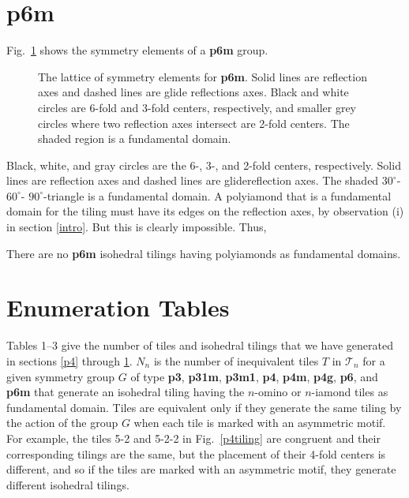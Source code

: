 \documentclass{ws-ijcga}
\begin{document}
\section{{\bf p6m}}
\label{p6m}
Fig.~\ref{fig:p6m} shows the symmetry elements of a {\bf p6m} group. 
\begin{figure}[h]
\centerline{
}
\vspace*{8pt}
\caption{
The lattice of symmetry elements for {\bf p6m}. 
Solid lines are reflection axes and dashed lines are glide reflections axes. 
Black and white circles are 6-fold and 3-fold centers, respectively, and smaller grey circles where
two reflection axes intersect are 2-fold centers. The shaded region is a fundamental domain.
\label{fig:p6m}
}
\end{figure}
Black, white, and gray circles are the 6-, 3-, and 2-fold centers, respectively. 
Solid lines are reflection axes and dashed lines are glidereflection axes. 
The shaded $30^\circ$- $60^\circ$- $90^\circ$-triangle is a fundamental domain. 
A polyiamond that is a fundamental domain for the tiling must have its edges on the reflection axes, 
by observation (i) in section \ref{intro}. 
But this is clearly impossible. Thus,
\begin{theorem}
There are no {\bf p6m} isohedral tilings having polyiamonds as fundamental domains.
\end{theorem}









\section{Enumeration Tables}
\label{tables}
Tables 1--3 give 
the number of tiles and isohedral tilings that we have generated in sections \ref{p4}
through \ref{p6m}. 
$N_n$ is the number of inequivalent tiles $T$ in $\mathscr{T}_n$
for a given symmetry group $G$ of type 
{\bf p3}, {\bf p31m}, {\bf p3m1}, {\bf p4}, {\bf p4m}, {\bf p4g}, {\bf p6},
and {\bf p6m} that generate an isohedral tiling having
the $n$-omino or $n$-iamond tiles as fundamental domain. 
Tiles are equivalent only if they generate the same tiling by the action of the group $G$ 
when each tile is marked with an asymmetric motif. 
For example, the tiles 5-2 and 5-2-2 in Fig.~\ref{p4tiling} are congruent and their
corresponding tilings are the same, but the placement of their 4-fold centers is different, 
and so if the tiles are marked with an asymmetric motif, they generate different isohedral tilings.
\end{document}
